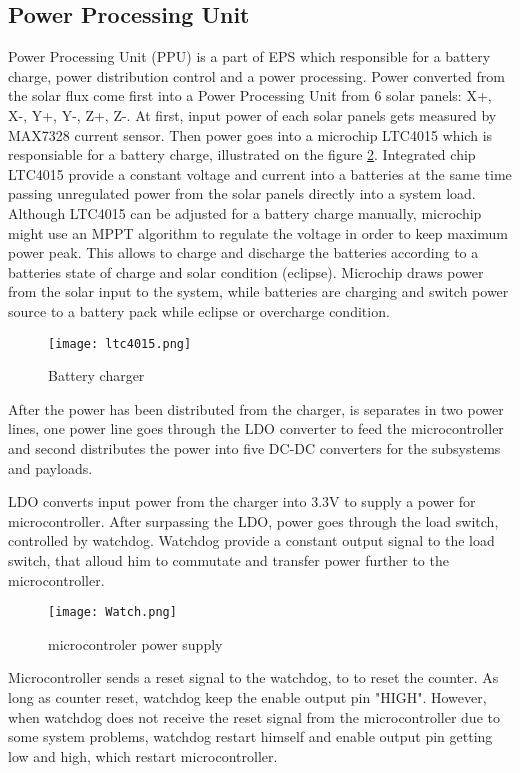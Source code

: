    \subsection{Power Processing Unit}
   Power Processing Unit (PPU) is a part of EPS which responsible for a battery charge, power distribution control and a power processing. 
   Power converted from the solar flux come first into a Power Processing Unit from 6 solar panels: X+, X-, Y+, Y-, Z+, Z-. At first, input power of each solar panels gets measured by MAX7328 current sensor. Then power goes into a microchip LTC4015 which is responsiable for a battery charge, illustrated on the figure \ref{fig: ltc4015}. Integrated chip LTC4015 provide a constant voltage and current into a batteries at the same time passing unregulated power from the solar panels directly into a system load. Although LTC4015 can be adjusted for a battery charge manually, microchip might use an MPPT algorithm to regulate the voltage in order to keep maximum power peak. This allows to charge and discharge the batteries according to a batteries state of charge and solar condition (eclipse). Microchip draws power from the solar input to the system, while batteries are charging and switch power source to a battery pack while eclipse or overcharge condition.
   
  \begin{figure}[h]
  	\centering
  	\texttt{[image: ltc4015.png]}
  	\caption{Battery charger}
  	\label{fig: ltc4015}
  \end{figure}
  
 After the power has been distributed from the charger, is separates in two power lines, one power line goes through the LDO converter to feed the microcontroller and second distributes the power into five DC-DC converters for the subsystems and payloads.
 
 LDO converts input power from the charger into 3.3V to supply a power for microcontroller. After surpassing the LDO, power goes through the load switch, controlled by watchdog. Watchdog provide a constant output signal to the load switch, that alloud him to commutate and transfer power further to the microcontroller. 
  
    \begin{figure}[h]
    	\centering
    	\texttt{[image: Watch.png]}
    	\caption{microcontroler power supply}
    	\label{fig: ltc4015}
    \end{figure}
  Microcontroller sends a reset signal to the watchdog, to to reset the counter. As long as counter reset, watchdog keep the enable output pin "HIGH". However, when watchdog does not receive the reset signal from the microcontroller due to some system problems, watchdog restart himself and enable output pin getting low and high, which restart microcontroller.
  

